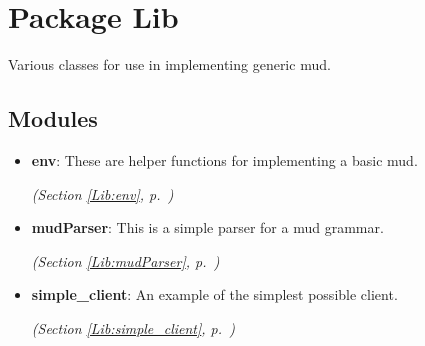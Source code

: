 %
%
%


\section{Package Lib}

    \label{Lib}
Various classes for use in implementing generic mud.



\subsection{Modules}

\begin{itemize}
\setlength{\parskip}{0ex}
\item \textbf{env}: These are helper functions for implementing a basic mud.



  \textit{(Section \ref{Lib:env}, p.~\pageref{Lib:env})}

\item \textbf{mudParser}: This is a simple parser for a mud grammar.



  \textit{(Section \ref{Lib:mudParser}, p.~\pageref{Lib:mudParser})}

\item \textbf{simple\_client}: An example of the simplest possible client.



  \textit{(Section \ref{Lib:simple_client}, p.~\pageref{Lib:simple_client})}

\end{itemize}

